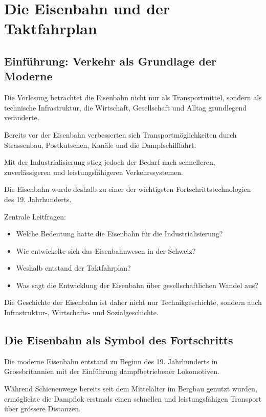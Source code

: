 \section{Die Eisenbahn und der Taktfahrplan}

\subsection{Einführung: Verkehr als Grundlage der Moderne}

Die Vorlesung betrachtet die Eisenbahn nicht nur als Transportmittel,
sondern als technische Infrastruktur,
die Wirtschaft, Gesellschaft und Alltag grundlegend veränderte.

Bereits vor der Eisenbahn verbesserten sich Transportmöglichkeiten
durch Strassenbau, Postkutschen, Kanäle und die Dampfschifffahrt.

Mit der Industrialisierung stieg jedoch der Bedarf nach schnelleren,
zuverlässigeren und leistungsfähigeren Verkehrssystemen.

Die Eisenbahn wurde deshalb zu einer der wichtigsten
Fortschrittstechnologien des 19. Jahrhunderts.

Zentrale Leitfragen:

\begin{itemize}
    \item Welche Bedeutung hatte die Eisenbahn für die Industrialisierung?
    \item Wie entwickelte sich das Eisenbahnwesen in der Schweiz?
    \item Weshalb entstand der Taktfahrplan?
    \item Was sagt die Entwicklung der Eisenbahn über gesellschaftlichen Wandel aus?
\end{itemize}

Die Geschichte der Eisenbahn ist daher nicht nur Technikgeschichte,
sondern auch Infrastruktur-, Wirtschafts- und Sozialgeschichte.

\subsection{Die Eisenbahn als Symbol des Fortschritts}

Die moderne Eisenbahn entstand zu Beginn des 19. Jahrhunderts
in Grossbritannien mit der Einführung dampfbetriebener Lokomotiven.

Während Schienenwege bereits seit dem Mittelalter
im Bergbau genutzt wurden,
ermöglichte die Dampflok erstmals einen schnellen
und leistungsfähigen Transport über grössere Distanzen.

